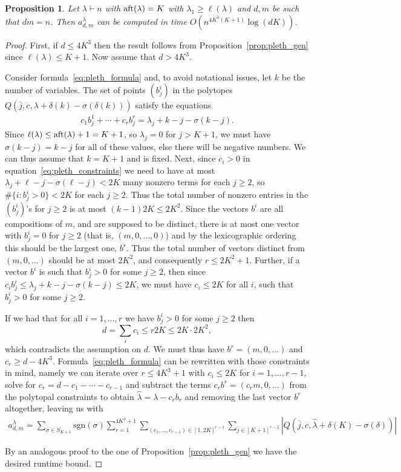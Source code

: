 \documentclass[11pt]{amsart}
\newtheorem{prop}[thm]{Proposition}
\theoremstyle{plain}
\theoremstyle{definition}
\numberwithin{equation}{section}
\newcommand{\la}{\lambda}
\def\sgn{\mathrm{sgn}}
\def\sgn{\mathrm{sgn}}
\def\la{\lambda}
\begin{document}
\begin{prop}\label{prop:pleth_aft}
Let $\la \vdash n$ with ${\rm aft}(\la)=K$ with $\la_1 \geq \ell(\la)$ and $d,m$ be such that $dm=n$. Then $a^\la_{d,m}$ can be computed in time $O(n^{4K^3(K+1)}\log(dK))$.
\end{prop} 
\begin{proof}
First, if $d \leq 4K^3$ then the result follows from Proposition~\ref{prop:pleth_gen} since $\ell(\la) \leq K+1$. Now assume that $d >4K^3$. 

Consider formula~\ref{eq:pleth_formula} and, to avoid notational issues, let $k$ be the number of variables.  The set of points $(b^i_j)$ in the polytopes $Q(\bar{j},c,\lambda+\delta(k)-\sigma(\delta(k)))$ satisfy the equations 
\begin{align}\label{eq:pleth_constraints}
c_1b^1_j+\cdots +c_r b^r_j = \la_j+ k -j - \sigma(k -j).
\end{align}
Since $\ell(\la) \leq {\rm aft}(\la)+1 =K+1$, so $\la_j=0$ for $j>K+1$, we must have $\sigma(k-j)=k-j$ for all of these values, else there will be negative numbers. We can thus assume that $k = K+1$ and is fixed. Next, since $c_i >0$ in equation~\ref{eq:pleth_constraints} we need to have at most $\la_j + \ell-j-\sigma(\ell -j) <2K$ many nonzero terms for each $j\geq 2$, so $\#\{ i: b^i_j >0\} <2K$ for each $j\geq 2$. Thus the total number of nonzero entries in the $(b^i_j)$'s for $j \geq 2$ is at most $(k-1)2K \leq 2K^2$. Since the vectors $b^i$ are all compositions of $m$, and are supposed to be distinct, there is at most one vector with $b^i_j=0$ for $j\geq 2$ (that is, $(m,0,\ldots,0)$) and by the lexicographic ordering this should be the largest one, $b^r$.  Thus the total number of vectors distinct from $(m,0,\ldots)$ should be at most $2K^2$, and consequently $r \leq 2K^2+1$. Further, if a vector $b^i$ is such that $b^i_j >0$ for some $j \geq 2$, then since $c_i b^i_j \leq \la_j + k-j - \sigma(k-j) \leq 2K$, we must have $c_i \leq 2K$ for all $i$, such that $b^i_j >0$ for some $j\geq 2$. 

If we had that for all $i=1,\ldots,r$ we have $b^i_j >0$ for some $j\geq 2$  then 
$$d = \sum_i c_i \leq r 2K \leq 2K\cdot 2K^2,$$
which contradicts the assumption on $d$. We must thus have $b^r = (m,0,\ldots)$ and $c_r \geq d - 4K^3$. 
Formula~\eqref{eq:pleth_formula} can be rewritten with those constraints in mind, namely we can iterate over $r \leq 4K^3+1$ with $c_i \leq 2K$ for $i=1,\ldots,r-1$, solve for $c_r = d-c_1-\cdots-c_{r-1}$ and subtract the terms $c_r b^r = (c_rm,0,\ldots)$ from the polytopal constraints to obtain $\hat{\la}= \la - c_rb_r$ and removing the last vector $b^r$ altogether, leaving us with
\begin{align}\label{eq:pleth_reduced}
a^\la_{d,m} = \sum_{\sigma \in S_{K+1} } \sgn(\sigma) \sum_{r=1}^{4K^3+1} \sum_{ (c_1,\ldots,c_{r-1}) \in [1,2K]^{r-1}} \sum_{\bar{j} \in[K+1]^{r-2}} |Q(\bar{j}, c, \hat{\la} +\delta(K) -\sigma(\delta))|
\end{align}

By an analogous proof to the one of Proposition~\ref{prop:pleth_gen} we have the desired runtime bound.
\end{proof}
\end{document}
